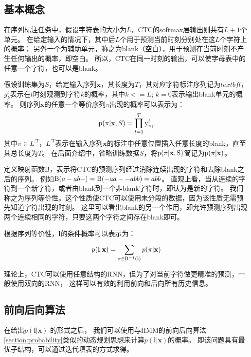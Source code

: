 \subsection{基本概念}

在序列标注任务中，假设字符表的大小为$L$，CTC的softmax层输出则共有$L+1$个单元。
在给定输入的情况下，其中后$L$个用于预测当前时刻分别处在这$L$个字符上的概率；
另外一个为辅助单元，称之为blank（空白），用于预测在当前时刻不产生任何输出的概率，即空白。
所以，CTC在同一时刻的输出，可以使字母表中的任意一个字符，也可以是blank。

假设训练集为$S$，给定输入序列$\textbf{x}$，其长度为$T$，其对应字符标注序列记为$textbf{l}$，
$y_k^t$表示在$t$时刻观测到字符$k$的概率，其中$k<=L$; $k=0$表示输出blank单元的概率。
则序列$\textbf{x}$的任意一个等价序列$\pi$出现的概率可以表示为：
\begin{equation}
\label{euqation:ctcpath}
{\rm{p}}(\pi | \textbf{x},S) = \prod\limits_{t = 1}^T {{\rm{y}}_{{\pi _t}}^t}
\end{equation}
其中$\pi  \in {L^{'T}}$，$L^{'T}$表示在输入序列$\textbf{x}$的标注中任意位置插入任意长度的blank，直至其总长度为$T$。
在后面介绍中，省略训练数据$S$，将$\rm{p}(\pi |\textbf{x},S)$简记为$\rm{p}(\pi|\textbf{x})$。

定义映射函数{\rm B}，表示将CTC的预测序列经过消除连续出现的字符和去除blank之后的序列。
例如${\rm B}(a - ab - ) = {\rm B}( - aa -  - abb) = abb$。
直观上看，当从连续的字符到一个新字符，或者由blank到一个非blank字符时，即认为是新的字符。
我们称之为序列等价性。这个性质使CTC可以使用未分段的数据，因为该性质无需预先知道字符出现的时刻。
这里可以看出blank的另一个作用，即允许预测序列出现两个连续相同的字符，只要这两个字符之间存在blank即可。

根据序列等价性，$\textbf{l}$的条件概率可以表示为：
\begin{equation}
\label{euqation:ctcallpath}
p({\textbf{l}}|{\textbf{x}}) = \sum\limits_{\pi  \in {{\rm B}^{ - 1}}({\textbf{l}})}^{} {p(\pi |{\textbf{x}})}
\end{equation}

理论上，CTC可以使用任意结构的RNN，但为了对当前字符做更精准的预测，一般使用双向的RNN，
这样可以有效的利用前向和后向所有历史信息。

\subsection{前向后向算法}

在给出$p({\textbf{l}}|{\textbf{x}})$ 的形式之后，
我们可以使用与HMM的前向后向算法\ref{section:probability}类似的动态规划思想来计算$p({\textbf{l}}|{\textbf{x}})$的概率。
即该问题具有最优子结构，可以通过迭代填表的方式求得。

